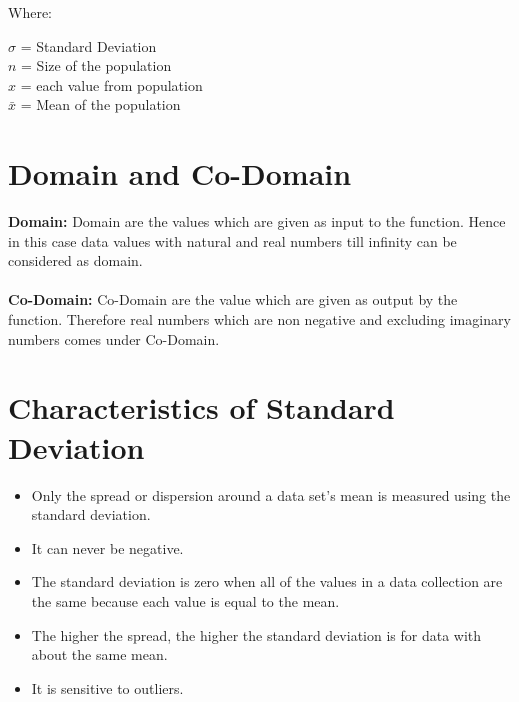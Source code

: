 \documentclass[12pt,a4paper]{report}
\begin{document}
Where:
    \begin{itemize}
        $\sigma$ = Standard Deviation\\
        $n$ = Size of the population\\
        $x$ = each value from population \\
        $\bar{x}$ = Mean of the population\\
    \end{itemize}

\section{Domain and Co-Domain}
\textbf{Domain:} Domain are the values which are given as input to the function. Hence in this case data values with natural and real numbers till infinity can be considered as domain.\\\\
\textbf{Co-Domain:} Co-Domain are the value which are given as output by the function. Therefore real numbers which are non negative and excluding imaginary numbers comes under Co-Domain. 

\section{Characteristics of Standard Deviation}
    \begin{itemize}[noitemsep]
        \item Only the spread or dispersion around a data set's mean is measured using the standard deviation.
        \item It can never be negative.
        \item The standard deviation is zero when all of the values in a data collection are the same because each value is equal to the mean.
        \item The higher the spread, the higher the standard deviation is for data with about the same mean.
        \item It is sensitive to outliers.
    \end{itemize}
\end{document}

